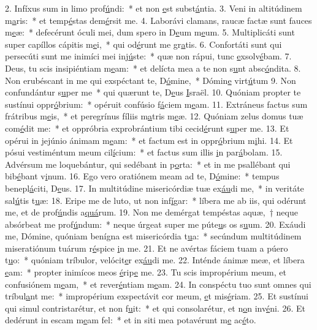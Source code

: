 2. Infíxus sum in limo prof\uline{ú}ndi:~* et non \uline{e}st subst\uline{á}ntia.
3. Veni in altitúdinem m\uline{a}ris:~* et temp\uline{é}stas dem\uline{é}rsit me.
4. Laborávi clamans, raucæ factæ sunt fauces m\uline{e}æ:~* defecérunt óculi mei, dum spero in D\uline{e}um m\uline{e}um.
5. Multiplicáti sunt super capíllos cápitis m\uline{e}i,~* qui od\uline{é}runt me gr\uline{a}tis.
6. Confortáti sunt qui persecúti sunt me inimíci mei inj\uline{ú}ste:~* quæ non rápui, tunc \uline{e}xsolv\uline{é}bam.
7. Deus, tu scis insipiéntiam m\uline{e}am:~* et delícta mea a te non s\uline{u}nt absc\uline{ó}ndita.
8. Non erubéscant in me qui exspéctant te, D\uline{ó}mine,~* Dómin\uline{e} virt\uline{ú}tum
9. Non confundántur s\uline{u}per me~* qui quærunt te, D\uline{e}us \uline{I}sraël.
10. Quóniam propter te sustínui oppr\uline{ó}brium:~* opéruit confúsio f\uline{á}ciem m\uline{e}am.
11. Extráneus factus sum frátribus m\uline{e}is,~* et peregrínus fíliis m\uline{a}tris m\uline{e}æ.
12. Quóniam zelus domus tuæ com\uline{é}dit me:~* et oppróbria exprobrántium tibi cecid\uline{é}runt s\uline{u}per me.
13. Et opérui in jejúnio ánimam m\uline{e}am:~* et factum est in oppr\uline{ó}brium m\uline{i}hi.
14. Et pósui vestiméntum meum cil\uline{í}cium:~* et factus sum illis \uline{i}n par\uline{á}bolam.
15. Advérsum me loquebántur, qui sedébant in p\uline{o}rta:~* et in me psallébant qui bib\uline{é}bant v\uline{i}num.
16. Ego vero oratiónem meam ad te, D\uline{ó}mine:~* tempus benepl\uline{á}citi, D\uline{e}us.
17. In multitúdine misericórdiæ tuæ ex\uline{áu}di me,~* in veritáte sal\uline{ú}tis t\uline{u}æ:
18. Eripe me de luto, ut non inf\uline{í}gar:~* líbera me ab iis, qui odérunt me, et de prof\uline{ú}ndis a\uline{quá}rum.
19. Non me demérgat tempéstas aquæ,~† neque absórbeat me prof\uline{ú}ndum:~* neque úrgeat super me púte\uline{u}s os s\uline{u}um.
20. Exáudi me, Dómine, quóniam benígna est misericórdia t\uline{u}a:~* secúndum multitúdinem miseratiónum tuárum r\uline{é}spice \uline{i}n me.
21. Et ne avértas fáciem tuam a púero t\uline{u}o:~* quóniam tríbulor, velócit\uline{e}r ex\uline{áu}di me.
22. Inténde ánimæ meæ, et líbera \uline{e}am:~* propter inimícos meos \uline{é}rip\uline{e} me.
23. Tu scis impropérium meum, et confusiónem m\uline{e}am,~* et rever\uline{é}ntiam m\uline{e}am.
24. In conspéctu tuo sunt omnes qui tríbul\uline{a}nt me:~* impropérium exspectávit cor meum, \uline{e}t mis\uline{é}riam.
25. Et sustínui qui simul contristarétur, et non f\uline{u}it:~* et qui consolarétur, et n\uline{o}n inv\uline{é}ni.
26. Et dedérunt in escam m\uline{e}am fel:~* et in siti mea potavérunt m\uline{e} ac\uline{é}to.

